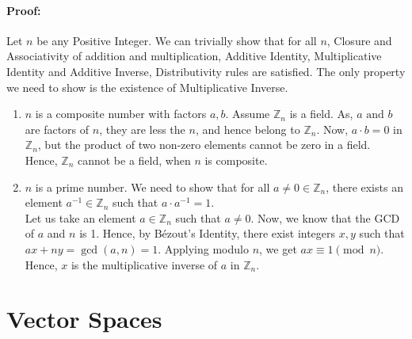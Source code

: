 \documentclass[12pt, oneside]{book}
\begin{document}
\paragraph{Proof:} Let \( n \) be any Positive Integer.
We can trivially show that for all \( n \), Closure and Associativity of addition and multiplication, Additive Identity, Multiplicative Identity and Additive Inverse, Distributivity rules are satisfied.
The only property we need to show is the existence of Multiplicative Inverse.
\begin{enumerate}[leftmargin=2.5cm, label=Case \arabic*:]
    \item \( n \) is a composite number with factors \( a, b \). 
Assume \( \mathbb{Z}_n \) is a field.
As, \( a \text{ and } b \) are factors of \( n \), they are less the \( n \), and hence belong to \( \mathbb{Z}_n \).
Now, \( a \cdot b = 0 \) in \( \mathbb{Z}_n \), but the product of two non-zero elements cannot be zero in a field. Hence, \( \mathbb{Z}_n \) cannot be a field, when \(n\) is composite.
    \item \( n \) is a prime number. We need to show that for all \( a \neq 0 \in \mathbb{Z}_n \), there exists an element \( a^{-1} \in \mathbb{Z}_n \) such that \( a \cdot a^{-1} = 1\).\\
Let us take an element \( a \in \mathbb{Z}_n \) such that \( a \neq 0 \).
Now, we know that the GCD of \( a \) and \( n \) is 1.
Hence, by Bézout's Identity, there exist integers \( x, y \) such that \( ax + ny = \gcd(a,n) = 1 \).
Applying modulo \( n \), we get \( ax \equiv 1 \pmod{n} \).
Hence, \( x \) is the multiplicative inverse of \( a \) in \( \mathbb{Z}_n \).
\end{enumerate}
\section{Vector Spaces}
\end{document}
